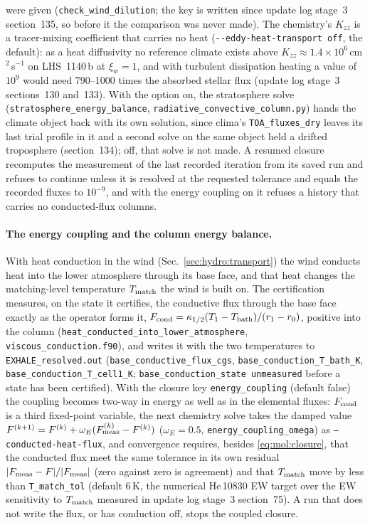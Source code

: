 were given (\texttt{check\_wind\_dilution}; the key is written since update
log stage~3 section~135, so before it the comparison was never made). The chemistry's $K_{zz}$ is a
tracer-mixing coefficient that carries no heat
(\texttt{-{}-eddy-heat-transport off}, the default): as a heat diffusivity no
reference climate exists above $K_{zz}\approx1.4\times10^{6}$\,cm$^2$\,s$^{-1}$
on LHS~1140\,b at $\xi_w=1$, and with turbulent dissipation heating
\citep{Hunten1974} a value of $10^{9}$ would need 790--1000 times the absorbed
stellar flux (update log stage~3 sections~130 and~133). With the option on,
the stratosphere solve (\texttt{stratosphere\_energy\_balance},
\texttt{radiative\_convective\_column.py}) hands the climate object back with
its own solution, since clima's \texttt{TOA\_fluxes\_dry} leaves its last
trial profile in it and a second solve on the same object held a drifted
troposphere (section~134); off, that solve is not made. A resumed closure
recomputes the measurement of the last recorded iteration from its saved run
and refuses to continue unless it is resolved at the requested tolerance
and equals the recorded fluxes to $10^{-9}$, and with the energy coupling
on it refuses a history that carries no conducted-flux columns.

\paragraph{The energy coupling and the column energy balance.} With
heat conduction in the wind (Sec.~\ref{sec:hydro:transport}) the wind
conducts heat into the lower atmosphere through its base face, and that heat
changes the matching-level temperature $T_{\rm match}$ the wind is built on.
The certification measures, on the state it certifies, the conductive flux
through the base face exactly as the operator forms it,
$F_{\rm cond} = \kappa_{1/2}(T_1-T_{\rm bath})/(r_1-r_0)$, positive into
the column (\texttt{heat\_conducted\_into\_lower\_atmosphere},
\texttt{viscous\_conduction.f90}), and writes it with the two temperatures to
\texttt{EXHALE\_resolved.out} (\texttt{base\_conductive\_flux\_cgs},
\texttt{base\_conduction\_T\_bath\_K}, \texttt{base\_conduction\_T\_cell1\_K};
\texttt{base\_conduction\_state unmeasured} before a state has been
certified). With the closure key \texttt{energy\_coupling} (default false)
the coupling becomes two-way in energy as well as in the elemental fluxes:
$F_{\rm cond}$ is a third fixed-point variable, the next chemistry solve
takes the damped value $F^{(k+1)} = F^{(k)} + \omega_E(F_{\rm meas}^{(k)} -
F^{(k)})$ ($\omega_E = 0.5$, \texttt{energy\_coupling\_omega}) as
\texttt{--conducted-heat-flux}, and convergence requires, besides
\eqref{eq:mol:closure}, that the conducted flux meet the same tolerance in
its own residual $|F_{\rm meas}-F|/|F_{\rm meas}|$ (zero against zero is
agreement) and that $T_{\rm match}$ move by less than
\texttt{T\_match\_tol} (default 6\,K, the numerical He\,10830 EW target over
the EW sensitivity to $T_{\rm match}$ measured in update log stage~3
section~75). A run that does not write the flux, or has conduction off,
stops the coupled closure.

